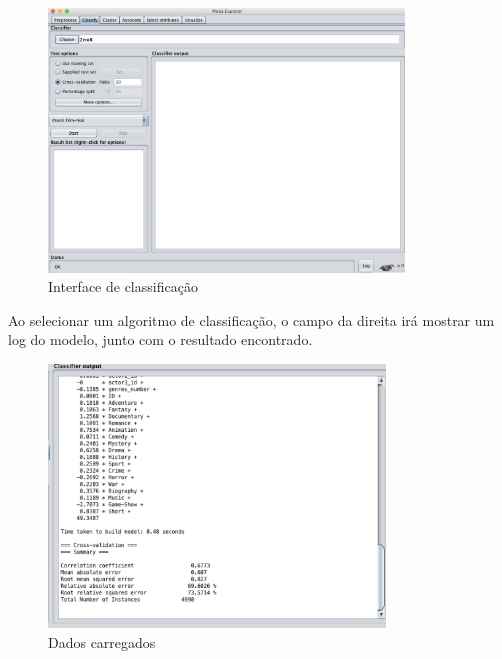 \begin{figure}[H]
\centering
\includegraphics[height=7cm]{imagens/weka.png}
\caption{Interface de classificação}
\label{classificationinterface}
\end{figure}

Ao selecionar um algoritmo de classificação, o campo da direita irá mostrar um log do modelo, junto com o resultado encontrado.
\begin{figure}[H]
\centering
\includegraphics[height=7cm]{imagens/wekauotput.png}
\caption{Dados carregados}
\label{figura23}
\end{figure}